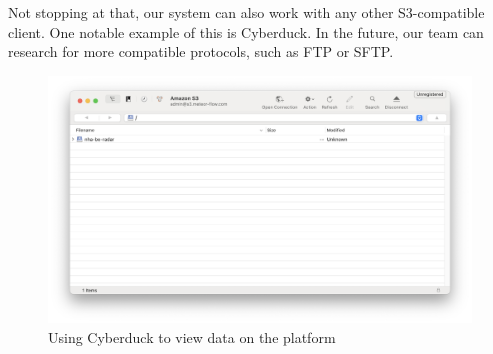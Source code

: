 Not stopping at that, our system can also work with any other S3-compatible
client. One notable example of this is Cyberduck. In the future, our team can
research for more compatible protocols, such as FTP or SFTP.

\begin{figure}[H]
    \centering
    \includegraphics[width=0.6\linewidth]{Images/4.3-datastore/s3-client.png}
    \vspace{1em}
    \caption{Using Cyberduck to view data on the platform}
    \label{fig:s3-client}
\end{figure}
